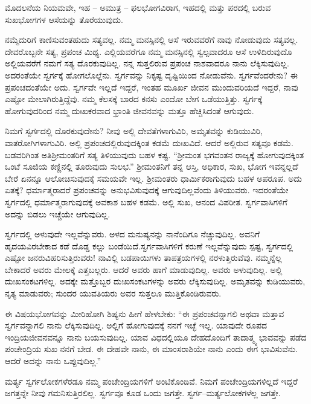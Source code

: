 ಮೊದಲನೆಯ ನಿಯಮವೇ, ಇಹ – ಅಮುತ್ರ – ಫಲಭೋಗವಿರಾಗ, ಇಹದಲ್ಲಿ ಮತ್ತು ಪರದಲ್ಲಿ ಬರುವ ಸುಖಭೋಗಗಳ ಆಸೆಯನ್ನು ತೊರೆಯುವುದು.

ನಮ್ಮೆದುರಿಗೆ ಕಾಣಿಸುವಂತಹುದು ಸತ್ಯವಲ್ಲ. ನಮ್ಮ ಮನಸ್ಸಿನಲ್ಲಿ ಆಸೆ ಇರುವವರೆಗೆ ನಾವು ನೋಡುವುದು ಸತ್ಯವಲ್ಲ. ದೇವರೊಬ್ಬನೇ ಸತ್ಯ, ಪ್ರಪಂಚ ಮಿಥ್ಯ. ಎಲ್ಲಿಯವರೆಗೂ ನಮ್ಮ ಮನಸ್ಸಿನಲ್ಲಿ ಸ್ವಲ್ಪವಾದರೂ ಆಸೆ ಉಳಿದಿರುವುದೊ ಅಲ್ಲಿಯವರೆಗೆ ನಮಗೆ ಸತ್ಯ ದೊರಕುವುದಿಲ್ಲ. ನನ್ನ ಸುತ್ತಲಿರುವ ಪ್ರಪಂಚ ನಾಶವಾದರೂ ನಾನು ಲೆಕ್ಕಿಸುವುದಿಲ್ಲ. ಅದರಂತೆಯೇ ಸ್ವರ್ಗಕ್ಕೆ ಹೋಗಲೊಲ್ಲೆನು. ಸ್ವರ್ಗವನ್ನು ನಿಕೃಷ್ಟ ದೃಷ್ಟಿಯಿಂದ ನೋಡುವೆನು. ಸ್ವರ್ಗವೆಂದರೇನು? ಈ ಪ್ರಪಂಚದಂತೆಯೇ ಅದು. ಸ್ವರ್ಗವೇ ಇಲ್ಲದೆ ಇದ್ದರೆ, ಇಂತಹ ಮೂರ್ಖ ಜೀವನ ಮುಂದುವರಿಯದೆ ಇದ್ದರೆ, ನಾವು ಎಷ್ಟೋ ಮೇಲಾಗಿರುತ್ತಿದ್ದೆವು. ನಮ್ಮ ಕೆಲಸಕ್ಕೆ ಬಾರದ ಕನಸು ಎಂದೋ ಬೇಗ ಒಡೆಯುತ್ತಿತ್ತು. ಸ್ವರ್ಗಕ್ಕೆ ಹೋಗುವುದರಿಂದ ನಮ್ಮ ದುಃಖಕರವಾದ ಭ್ರಾಂತಿ ಜೀವನವನ್ನು ಮತ್ತೂ ಹೆಚ್ಚಿಸಿದಂತೆ ಆಗುವುದು.

ನಿಮಗೆ ಸ್ವರ್ಗದಲ್ಲಿ ದೊರಕುವುದೇನು? ನೀವು ಅಲ್ಲಿ ದೇವತೆಗಳಾಗುವಿರಿ, ಅಮೃತವನ್ನು ಕುಡಿಯುವಿರಿ, ವಾತರೋಗಿಗಳಾಗುವಿರಿ. ಅಲ್ಲಿ ಪ್ರಪಂಚದಲ್ಲಿರುವುದಕ್ಕಿಂತ ಕಡಮೆ ದುಃಖವಿದೆ. ಆದರೆ ಅಲ್ಲಿರುವ ಸತ್ಯವೂ ಕಡಮೆ. ಬಡವರಿಗಿಂತ ಅತಿ\break ಶ‍್ರೀಮಂತರಿಗೆ ಸತ್ಯ ತಿಳಿಯುವುದು ಬಹಳ ಕಷ್ಟ. “ಶ‍್ರೀಮಂತ ಭಗವಂತನ ರಾಜ್ಯಕ್ಕೆ ಹೋಗುವುದಕ್ಕಿಂತ ಒಂಟೆ ಸೂಜಿಯ ಕಣ್ಣಿನಲ್ಲಿ ತೂರುವುದು ಸುಲಭ.'' ಶ‍್ರೀಮಂತನಿಗೆ ತನ್ನ ಆಸ್ತಿ, ಅಧಿಕಾರ, ಸುಖ, ಭೋಗ ಇವನ್ನಲ್ಲದೆ ಬೇರೆ ಏನನ್ನೂ ಆಲೋಚಿಸುವುದಕ್ಕೆ ಸಮಯವೇ ಇಲ್ಲ. ಶ‍್ರೀಮಂತರು ಧಾರ್ಮಿಕರಾಗುವುದು ಬಹಳ ಅಪರೂಪ. ಅದು ಏತಕ್ಕೆ? ಧರ್ಮಾತ್ಮರಾದರೆ ಪ್ರಪಂಚವನ್ನು ಅನುಭವಿಸುವುದಕ್ಕೆ ಆಗುವುದಿಲ್ಲವೆಂದು ತಿಳಿಯುವರು. ಇದರಂತೆಯೇ ಸ್ವರ್ಗದಲ್ಲಿ ಧರ್ಮಾತ್ಮರಾಗುವುದಕ್ಕೆ ಅವಕಾಶ ಬಹಳ ಕಡಮೆ. ಅಲ್ಲಿ ಸುಖ, ಆನಂದ ವಿಪರೀತ. ಸ್ವರ್ಗವಾಸಿಗಳಿಗೆ ಅದನ್ನು ಬಿಡಲು ಇಚ್ಚೆಯೇ ಆಗುವುದಿಲ್ಲ.

ಸ್ವರ್ಗದಲ್ಲಿ ಅಳುವುದೇ ಇಲ್ಲವೆನ್ನುವರು. ಅಳದ ಮನುಷ್ಯನನ್ನು ನಾನೆಂದಿಗೂ ನೆಚ್ಚುವುದಿಲ್ಲ. ಅವನಿಗೆ ಹೃದಯವಿರಬೇಕಾದ ಕಡೆ ದೊಡ್ಡ ಕಲ್ಲು ಬಂಡೆಯಿದೆ.\break ಸ್ವರ್ಗವಾಸಿಗಳಿಗೆ ಕರುಣೆ ಇಲ್ಲವೆನ್ನುವುದು ಸ್ಪಷ್ಟ, ಸ್ವರ್ಗದಲ್ಲಿ ಎಷ್ಟೋ ಜನರು\break ವಿಹರಿಸುತ್ತಿರುವರು! ನಾವಿಲ್ಲಿ ಬಡಪಾಯಿಗಳು ತಾಪತ್ರಯಗಳಲ್ಲಿ ನರಳುತ್ತಿರುವೆವು. ನಮ್ಮನ್ನೆಲ್ಲ ಬೇಕಾದರೆ ಅವರು ಮೇಲಕ್ಕೆ ಎತ್ತಬಲ್ಲರು. ಆದರೆ ಅವರು ಹಾಗೆ ಮಾಡುವುದಿಲ್ಲ. ಅವರು ಅಳುವುದಿಲ್ಲ. ಅಲ್ಲಿ ದುಃಖಸಂಕಟಗಳಿಲ್ಲ. ಅದಕ್ಕೇ ಮತ್ತೊಬ್ಬರ ದುಃಖಸಂಕಟಗಳನ್ನು ಅವರು ಲೆಕ್ಕಿಸುವುದಿಲ್ಲ. ಅಮೃತವನ್ನು ಕುಡಿಯುವರು, ನೃತ್ಯ ಮಾಡುವರು; ಸುಂದರ ಯುವತಿಯರು ಅವರ ಸುತ್ತಲೂ ಮುತ್ತಿಕೊಂಡಿರುವರು.

ಈ ವಿಷಯಭೋಗವನ್ನು ಮೀರಿಹೋಗಿ ಶಿಷ್ಯನು ಹೀಗೆ ಹೇಳಬೇಕು: “ಈ ಪ್ರಪಂಚವನ್ನಾಗಲಿ ಅಥವಾ ಮತ್ತಾವ ಸ್ವರ್ಗವನ್ನಾಗಲಿ ನಾನು ಲೆಕ್ಕಿಸುವುದಿಲ್ಲ. ಅಲ್ಲಿಗೆ ಹೋಗುವುದಕ್ಕೆ ನನಗೆ ಇಚ್ಛೆ ಇಲ್ಲ. ಯಾವುದೇ ರೂಪದ ಇಂದ್ರಿಯಜೀವನವನ್ನೂ ನಾನು ಬಯಸುವುದಿಲ್ಲ. ಯಾವ ವಿಧದಲ್ಲಿಯೂ ದೇಹದೊಂದಿಗೆ ತಾದಾತ್ಮ್ಯ ಭಾವವನ್ನು ಪಡೆದ ಪಂಚೇಂದ್ರಿಯ ಸುಖ ನನಗೆ ಬೇಡ. ಈ ದೇಹವೇ ನಾನು, ಈ ಮಾಂಸರಾಶಿಯೇ ನಾನು ಎಂದು ಈಗ ಭಾವಿಸುವೆನು. ಆದರೆ ಅದನ್ನು ನಾನು ಒಪ್ಪುವುದಿಲ್ಲ.”

ಮರ್ತ್ಯ ಸ್ವರ್ಗಲೋಕಗಳೆರಡೂ ನಮ್ಮ ಪಂಚೇಂದ್ರಿಯಗಳಿಗೆ ಅಂಟಿಕೊಂಡಿವೆ. ನಿಮಗೆ ಪಂಚೇಂದ್ರಿಯಗಳಿಲ್ಲದೆ ಇದ್ದರೆ ಜಗತ್ತನ್ನೇ ನೀವು ಗಮನಿಸುತ್ತಿರಲಿಲ್ಲ. ಸ್ವರ್ಗವೂ ಕೂಡ ಒಂದು ಜಗತ್ತೇ. ಸ್ವರ್ಗ–ಮರ್ತ್ಯಲೋಕಗಳೆಲ್ಲ ಜಗತ್ತೇ.

